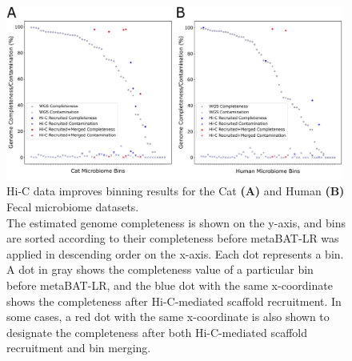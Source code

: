 \documentclass[fleqn,10pt,lineno]{wlpeerj}
\begin{document}
\begin{figure}[ht!]
	\centering
	\includegraphics[width=0.99\textwidth]{Fig3.pdf}
	\caption{Hi-C data improves binning results for the Cat \textbf{(A)} and Human \textbf{(B)} Fecal microbiome datasets.
    \\ The estimated genome completeness is shown on the y-axis, and bins are sorted according to their completeness before metaBAT-LR was applied in descending order on the x-axis. Each dot represents a bin. A dot in gray shows the completeness value of a particular bin before metaBAT-LR, and the blue dot with the same x-coordinate shows the completeness after Hi-C-mediated scaffold recruitment. In some cases, a red dot with the same x-coordinate is also shown to designate the completeness after both Hi-C-mediated scaffold recruitment and bin merging. }
	\label{fig:Cat_and_human}
\end{figure}
\end{document}
